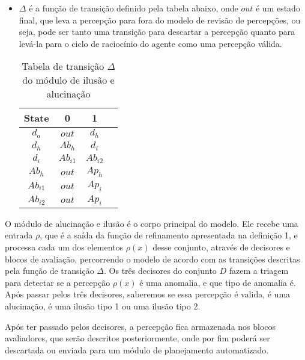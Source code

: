 \begin{definition}
\begin{itemize}
        \item $\Delta$ é a função de transição definido pela tabela abaixo, onde $out$ é um estado final, que leva a percepção para fora do modelo de revisão de percepções, ou seja, pode ser tanto uma transição para descartar a percepção quanto para levá-la para o ciclo de raciocínio do agente como uma percepção válida.
        
            \begin{table}[htb]
                \centering
                \begin{tabular}{c c c c} 
                    \toprule
                    \textbf{State} & \textbf{0} & \textbf{1} \\
                    \midrule
                    $d_{a}$     & $out$     & $d_{h}$       \\
                    $d_{h}$     & $Ab_{h}$  & $d_{i}$       \\
                    $d_{i}$     & $Ab_{i1}$ & $Ab_{i2}$     \\
                    $Ab_{h}$    & $out$     & $Ap_{h}$      \\
                    $Ab_{i1}$   & $out$     & $Ap_{i}$      \\
                    $Ab_{i2}$   & $out$     & $Ap_{i}$      \\
                    \bottomrule
                \end{tabular}
                \label{transition-table}
                \caption{Tabela de transição $\Delta$ do módulo de ilusão e alucinação}
                
            \end{table}
    \end{itemize}{}
\end{definition}{}

O módulo de alucinação e ilusão é o corpo principal do modelo. Ele recebe uma entrada $\rho$, que é a saída da função de refinamento apresentada na definição 1, e processa cada um dos elementos $\rho(x)$ desse conjunto, através de decisores e blocos de avaliação, percorrendo o modelo de acordo com as transições descritas pela função de transição $\Delta$. Os três decisores do conjunto $D$ fazem a triagem para detectar se a percepção $\rho(x)$ é uma anomalia, e que tipo de anomalia é. Após passar pelos três decisores, saberemos se essa percepção é valida, é uma alucinação, é uma ilusão tipo 1 ou uma ilusão tipo 2.

Após ter passado pelos decisores, a percepção fica armazenada nos blocos avaliadores, que serão descritos posteriormente, onde por fim poderá ser descartada ou enviada para um módulo de planejamento automatizado.

